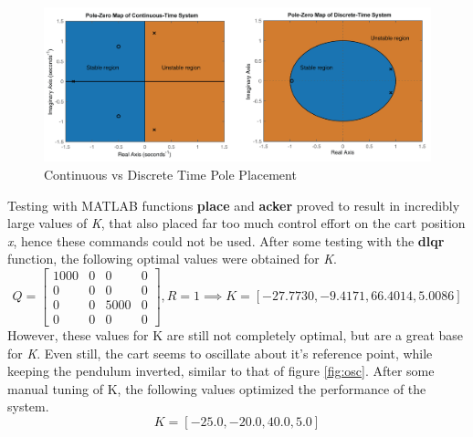 \documentclass[12pt]{article}
\begin{document}
\begin{figure}[H]
    \centering
    \includegraphics[width=.8\linewidth]{figures/dtpoles.png}
    \caption{Continuous vs Discrete Time Pole Placement \cite{pz}}
    \label{fig:pz}
\end{figure}
Testing with MATLAB functions \textbf{place} and \textbf{acker} proved to result in incredibly large values of \textit{K}, that also placed far too much control effort on the cart position \textit{x}, hence these commands could not be used. After some testing with the \textbf{dlqr} function, the following optimal values were obtained for \textit{K}.
\begin{equation}
    Q =
    \begin{bmatrix}
    1000 & 0 & 0 & 0\\
    0 & 0 & 0 & 0\\
    0 & 0 & 5000 & 0\\
    0 & 0 & 0 & 0
    \end{bmatrix},
    R = 1 \implies K = [-27.7730,-9.4171,66.4014,5.0086]
\end{equation}
However, these values for K are still not completely optimal, but are a great base for \textit{K}. Even still, the cart seems to oscillate about it's reference point, while keeping the pendulum inverted, similar to that of figure \ref{fig:osc}. After some manual tuning of K, the following values optimized the performance of the system.
\begin{equation}
    K = [-25.0,-20.0,40.0,5.0]
\end{equation}
\end{document}
